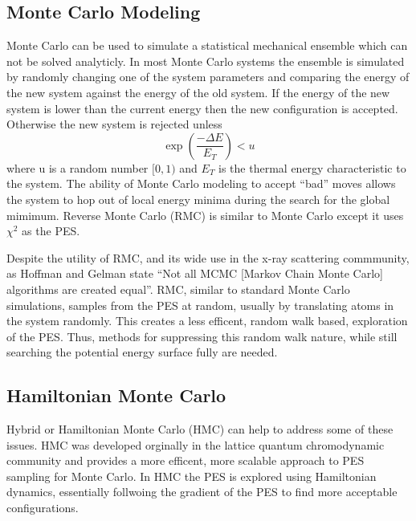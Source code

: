 \subsection{Monte Carlo Modeling}
Monte Carlo can be used to simulate a statistical mechanical ensemble which can not be solved analyticly.
In most Monte Carlo systems the ensemble is simulated by randomly changing one of the system parameters and comparing the energy of the new system against the energy of the old system.
If the energy of the new system is lower than the current energy then the new configuration is accepted.
Otherwise the new system is rejected unless
\[
\exp(\frac{-\Delta E}{E_{T}}) < u
\]
where u is a random number $[0, 1)$ and $E_{T}$ is the thermal energy characteristic to the system.
The ability of Monte Carlo modeling to accept ``bad'' moves allows the system to hop out of local energy minima during the search for the global mimimum.
Reverse Monte Carlo (RMC) is similar to Monte Carlo except it uses $\chi^{2}$ as the PES.\cite{McGreevy}

Despite the utility of RMC, and its wide use in the x-ray scattering commmunity, as Hoffman and Gelman state ``Not all MCMC [Markov Chain Monte Carlo] algorithms are created equal''.\cite{Hoffman2014}
RMC, similar to standard Monte Carlo simulations, samples from the PES at random, usually by translating atoms in the system randomly.
This creates a less efficent, random walk based, exploration of the PES.\cite{Hoffman2014, Neal1993}
Thus, methods for suppressing this random walk nature, while still searching the potential energy surface fully are needed.

\subsection{Hamiltonian Monte Carlo}
Hybrid or Hamiltonian Monte Carlo (HMC) can help to address some of these issues.
HMC was developed orginally in the lattice quantum chromodynamic community and provides a more efficent, more scalable approach to PES sampling for Monte Carlo.\cite{Duane1987216, Neal2011}
In HMC the PES is explored using Hamiltonian dynamics, essentially follwoing the gradient of the PES to find more acceptable configurations.


